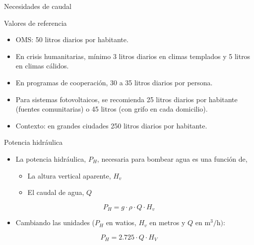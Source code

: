 \documentclass[xcolor={usenames,svgnames,dvipsnames}]{beamer}
\begin{document}
\begin{frame}[label={sec:orgb97c54d}]{Necesidades de caudal}
\begin{block}{Valores de referencia}
\begin{itemize}
\item \alert{OMS}: 50 litros diarios por habitante.

\item En \alert{crisis humanitarias}, mínimo 3 litros diarios en climas templados y 5 litros en climas cálidos.

\item En \alert{programas de cooperación}, 30 a 35 litros diarios por persona.

\item Para \alert{sistemas fotovoltaicos}, se recomienda 25 litros diarios por habitante (fuentes comunitarias) o 45 litros (con grifo en cada domicilio).

\item \alert{Contexto}: en grandes ciudades 250 litros diarios por habitante.
\end{itemize}
\end{block}
\end{frame}


\begin{frame}[label={sec:org4f83ca2}]{Potencia hidráulica}
\begin{itemize}
\item La \alert{potencia hidráulica}, \(P_{H}\), necesaria para bombear agua es una función de,

\begin{itemize}
\item La \alert{altura vertical aparente}, \(H_{v}\)

\item El \alert{caudal de agua}, \(Q\)
\end{itemize}
\end{itemize}

$$P_{H}=g\cdot\rho\cdot Q\cdot H_{v}$$

\begin{itemize}
\item Cambiando las unidades (\(P_{H}\) en watios, \(H_{v}\) en metros y \(Q\) en \(\si{\meter\cubed\per\hour})\):
\end{itemize}
\[
P_{H}=2.725\cdot Q\cdot H_{V}
\]
\end{frame}
\end{document}

